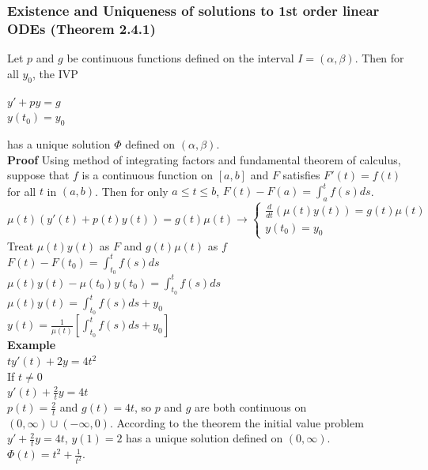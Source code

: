 \documentclass{article}
\begin{document}
\subsubsection{Existence and Uniqueness of solutions to 1st order linear ODEs (Theorem 2.4.1)}
Let $p$ and $g$ be continuous functions defined on the interval $I=(\alpha,\beta)$. Then for all $y_0$, the IVP
\begin{center}
    $y'+py=g$\\
    $y(t_0)=y_0$
\end{center}
has a unique solution $\Phi$ defined on $(\alpha,\beta)$.\\
\newpage
\textbf{Proof}
Using method of integrating factors and fundamental theorem of calculus, suppose that $f$ is a continuous function on $[a,b]$ and $F$ satisfies $F'(t)=f(t)$ for all $t$ in $(a,b)$. Then for only $a\leq t\leq b$, $F(t)-F(a)=\int_a^tf(s)ds$.\\
$\mu(t)(y'(t)+p(t)y(t))=g(t)\mu(t)\rightarrow\begin{cases}
    \frac{d}{dt}(\mu(t) y(t))=g(t)\mu(t)\\
    y(t_0)=y_0
\end{cases}$\\
Treat $\mu(t) y(t)$ as $F$ and $g(t)\mu(t)$ as $f$\\
$F(t)-F(t_0)=\int_{t_0}^tf(s)ds$\\
$\mu(t) y(t)-\mu(t_0) y(t_0)=\int_{t_0}^tf(s)ds$\\
$\mu(t) y(t)=\int_{t_0}^tf(s)ds+y_0$\\
$y(t)=\frac{1}{\mu(t)}[\int_{t_0}^tf(s)ds+y_0]$\\
\newline
\textbf{Example}\\
$ty'(t)+2y=4t^2$\\
If $t\neq 0$\\
$y'(t)+\frac{2}{t}y=4t$\\
$p(t)=\frac{2}{t}$ and $g(t)=4t$, so $p$ and $g$ are both continuous on $(0,\infty)\cup(-\infty,0)$. According to the theorem the initial value problem $y'+\frac{2}{t}y=4t$, $y(1)=2$ has a unique solution defined on $(0,\infty)$. $\Phi(t)=t^2+\frac{1}{t^2}$.
\end{document}
